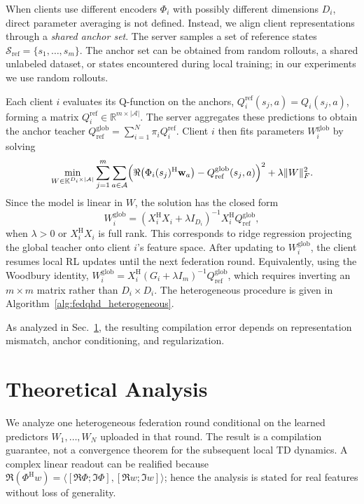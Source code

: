\documentclass[sigconf,anonymous]{aamas}
\theoremstyle{plain}
\theoremstyle{definition}
\theoremstyle{remark}
\begin{document}
When clients use different encoders $\Phi_i$ with possibly different dimensions $D_i$, direct parameter averaging is not defined. Instead, we align client representations through a \emph{shared anchor set}. The server samples a set of reference states $\mathcal{S}_{\mathrm{ref}}=\{s_1,\dots,s_m\}$. The anchor set can be obtained from random rollouts, a shared unlabeled dataset, or states encountered during local training; in our experiments we use random rollouts.

Each client $i$ evaluates its Q-function on the anchors,
$Q^{\mathrm{ref}}_i(s_j,a)=Q_i(s_j,a)$, forming a matrix $Q^{\mathrm{ref}}_i\in\mathbb{R}^{m\times|\mathcal{A}|}$. The server aggregates these predictions to obtain the anchor teacher $Q^{\mathrm{glob}}_{\mathrm{ref}}
=\sum_{i=1}^N \pi_i Q^{\mathrm{ref}}_i.$ Client $i$ then fits parameters $W_i^{\mathrm{glob}}$ by solving
\[
\min_{W\in\mathbb{K}^{D_i\times|\mathcal{A}|}}
\sum_{j=1}^m\sum_{a\in\mathcal{A}}
\Bigl(\Re\bigl(\Phi_i(s_j)^{\mathrm H}\mathbf w_a\bigr)
-Q^{\mathrm{glob}}_{\mathrm{ref}}(s_j,a)\Bigr)^2
+\lambda\|W\|_F^2.
\]
Since the model is linear in $W$, the solution has the closed form
\[
W^{\mathrm{glob}}_i=
\left(X_i^{\mathrm H}X_i+\lambda I_{D_i}\right)^{-1}X_i^{\mathrm H}Q^{\mathrm{glob}}_{\mathrm{ref}},
\]
when $\lambda>0$ or $X_i^{\mathrm H}X_i$ is full rank.
This corresponds to ridge regression projecting the global teacher onto client $i$’s feature space. After updating to $W_i^{\mathrm{glob}}$, the client resumes local RL updates until the next federation round. Equivalently, using the Woodbury identity, $W_i^{\mathrm{glob}} = X_i^{\mathrm H}(G_i + \lambda I_m)^{-1} Q_{\mathrm{ref}}^{\mathrm{glob}}$, which requires inverting an $m\times m$ matrix rather than $D_i\times D_i$. The heterogeneous procedure is given in Algorithm~\ref{alg:fedqhd_heterogeneous}.

As analyzed in Sec.~\ref{sec:theory}, the resulting compilation error depends on representation mismatch, anchor conditioning, and regularization.


\section{Theoretical Analysis}
\label{sec:theory}
We analyze one heterogeneous federation round conditional on the learned
predictors $W_1,\ldots,W_N$ uploaded in that round.  The result is a
compilation guarantee, not a convergence theorem for the subsequent local
TD dynamics.  A complex linear readout can be realified because
$\Re(\Phi^{\mathrm H}w)=\langle[\Re\Phi;\Im\Phi],
[\Re w;\Im w]\rangle$; hence the analysis is stated for real features
without loss of generality.
\end{document}
